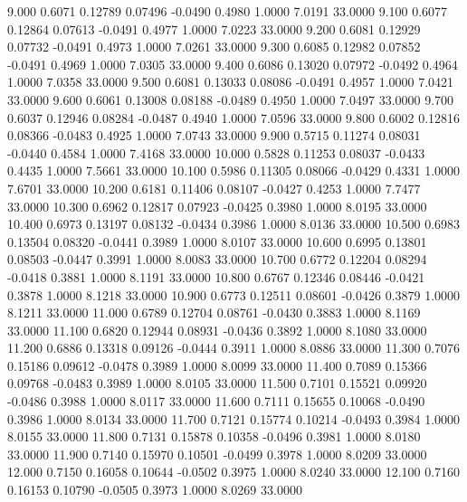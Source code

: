    9.000   0.6071   0.12789   0.07496  -0.0490   0.4980   1.0000   7.0191  33.0000
   9.100   0.6077   0.12864   0.07613  -0.0491   0.4977   1.0000   7.0223  33.0000
   9.200   0.6081   0.12929   0.07732  -0.0491   0.4973   1.0000   7.0261  33.0000
   9.300   0.6085   0.12982   0.07852  -0.0491   0.4969   1.0000   7.0305  33.0000
   9.400   0.6086   0.13020   0.07972  -0.0492   0.4964   1.0000   7.0358  33.0000
   9.500   0.6081   0.13033   0.08086  -0.0491   0.4957   1.0000   7.0421  33.0000
   9.600   0.6061   0.13008   0.08188  -0.0489   0.4950   1.0000   7.0497  33.0000
   9.700   0.6037   0.12946   0.08284  -0.0487   0.4940   1.0000   7.0596  33.0000
   9.800   0.6002   0.12816   0.08366  -0.0483   0.4925   1.0000   7.0743  33.0000
   9.900   0.5715   0.11274   0.08031  -0.0440   0.4584   1.0000   7.4168  33.0000
  10.000   0.5828   0.11253   0.08037  -0.0433   0.4435   1.0000   7.5661  33.0000
  10.100   0.5986   0.11305   0.08066  -0.0429   0.4331   1.0000   7.6701  33.0000
  10.200   0.6181   0.11406   0.08107  -0.0427   0.4253   1.0000   7.7477  33.0000
  10.300   0.6962   0.12817   0.07923  -0.0425   0.3980   1.0000   8.0195  33.0000
  10.400   0.6973   0.13197   0.08132  -0.0434   0.3986   1.0000   8.0136  33.0000
  10.500   0.6983   0.13504   0.08320  -0.0441   0.3989   1.0000   8.0107  33.0000
  10.600   0.6995   0.13801   0.08503  -0.0447   0.3991   1.0000   8.0083  33.0000
  10.700   0.6772   0.12204   0.08294  -0.0418   0.3881   1.0000   8.1191  33.0000
  10.800   0.6767   0.12346   0.08446  -0.0421   0.3878   1.0000   8.1218  33.0000
  10.900   0.6773   0.12511   0.08601  -0.0426   0.3879   1.0000   8.1211  33.0000
  11.000   0.6789   0.12704   0.08761  -0.0430   0.3883   1.0000   8.1169  33.0000
  11.100   0.6820   0.12944   0.08931  -0.0436   0.3892   1.0000   8.1080  33.0000
  11.200   0.6886   0.13318   0.09126  -0.0444   0.3911   1.0000   8.0886  33.0000
  11.300   0.7076   0.15186   0.09612  -0.0478   0.3989   1.0000   8.0099  33.0000
  11.400   0.7089   0.15366   0.09768  -0.0483   0.3989   1.0000   8.0105  33.0000
  11.500   0.7101   0.15521   0.09920  -0.0486   0.3988   1.0000   8.0117  33.0000
  11.600   0.7111   0.15655   0.10068  -0.0490   0.3986   1.0000   8.0134  33.0000
  11.700   0.7121   0.15774   0.10214  -0.0493   0.3984   1.0000   8.0155  33.0000
  11.800   0.7131   0.15878   0.10358  -0.0496   0.3981   1.0000   8.0180  33.0000
  11.900   0.7140   0.15970   0.10501  -0.0499   0.3978   1.0000   8.0209  33.0000
  12.000   0.7150   0.16058   0.10644  -0.0502   0.3975   1.0000   8.0240  33.0000
  12.100   0.7160   0.16153   0.10790  -0.0505   0.3973   1.0000   8.0269  33.0000
